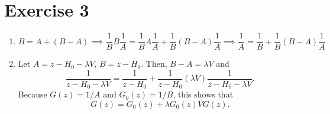 \documentclass[12pt]{article}
\begin{document}
\section*{Exercise 3}
\begin{enumerate}[label=(\alph*)]
    \item \[ B = A + (B - A) \implies \frac{1}{B}B\frac{1}{A} = \frac{1}{B}A\frac{1}{A} + \frac{1}{B}(B-A)\frac{1}{A} \implies \frac{1}{A} = \frac{1}{B} + \frac{1}{B}(B-A)\frac{1}{A} \]
    \item Let $A = z - H_0 - \lambda V$, $B = z - H_0$. Then, $B - A = \lambda V$ and
    \[ \frac{1}{z - H_0 - \lambda V} = \frac{1}{z-H_0} + \frac{1}{z-H_0}(\lambda V)\frac{1}{z-H_0-\lambda V}.  \]
    Because $G(z) = 1/A$ and $G_0(z) = 1/B$, this shows that
    \[ G(z) = G_0(z) + \lambda G_0(z)VG(z). \]
\end{enumerate}
\end{document}
